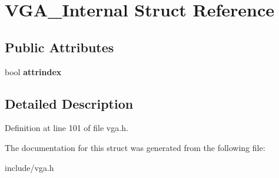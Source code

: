 \hypertarget{structVGA__Internal}{\section{V\-G\-A\-\_\-\-Internal Struct Reference}
\label{structVGA__Internal}
}
\subsection*{Public Attributes}
\begin{DoxyCompactItemize}
\item 
\hypertarget{structVGA__Internal_a36feb3e3abbf2c0f50f3fbe45ad763aa}{bool {\bfseries attrindex}}\label{structVGA__Internal_a36feb3e3abbf2c0f50f3fbe45ad763aa}

\end{DoxyCompactItemize}


\subsection{Detailed Description}


Definition at line 101 of file vga.\-h.



The documentation for this struct was generated from the following file\-:\begin{DoxyCompactItemize}
\item 
include/vga.\-h\end{DoxyCompactItemize}

